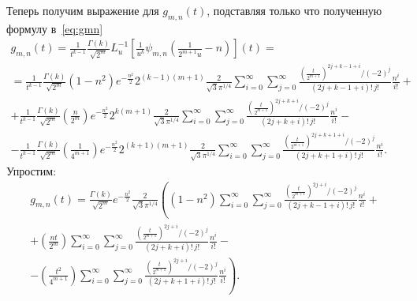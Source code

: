 \documentclass[12pt, a4paper]{report}
\begin{document}
Теперь получим выражение для $g_{m,n}(t)$, подставляя только что полученную формулу в~\ref{eq:gmn}
\begin{multline*}
    g_{m,n}(t) = 
    \frac{1}{t^{k-1}} \frac{\Gamma(k)}{\sqrt{2^m}} L^{-1}_u \left[ \frac{1}{u^k} \psi_{m,n} \left( \frac{1}{2^{m+1} u} - n \right) \right] (t)
=\\=
    \frac{1}{t^{k-1}} \frac{\Gamma(k)}{\sqrt{2^m}} \left( 1-n^2 \right) 
    e^{-\frac{n^2}{2}} 2^{(k-1)(m+1)} \frac{2}{\sqrt{3} \pi^{1/4}}
    \sum_{i=0}^{\infty} \sum_{j=0}^{\infty} \frac{\left( \frac{t}{2^{m+1}} \right) ^{2j+k-1+i} / (-2)^j}{(2j+k-1+i)!\,j!} \frac{n^i}{i!}
+\\+
    \frac{1}{t^{k-1}} \frac{\Gamma(k)}{\sqrt{2^m}} \left( \frac{n}{2^m} \right) 
    e^{-\frac{n^2}{2}} 2^{k(m+1)} \frac{2}{\sqrt{3} \pi^{1/4}}
    \sum_{i=0}^{\infty} \sum_{j=0}^{\infty} \frac{\left( \frac{t}{2^{m+1}} \right) ^{2j+k+i} / (-2)^j}{(2j+k+i)!\,j!} \frac{n^i}{i!}
-\\-
    \frac{1}{t^{k-1}} \frac{\Gamma(k)}{\sqrt{2^m}} \left( \frac{1}{4^{m+1}} \right) 
    e^{-\frac{n^2}{2}} 2^{(k+1)(m+1)} \frac{2}{\sqrt{3} \pi^{1/4}}
    \sum_{i=0}^{\infty} \sum_{j=0}^{\infty} \frac{\left( \frac{t}{2^{m+1}} \right) ^{2j+k+1+i} / (-2)^j}{(2j+k+1+i)!\,j!} \frac{n^i}{i!}
.\end{multline*}
Упростим:
\begin{multline*}
    g_{m,n}(t)
=
    \frac{\Gamma(k)}{\sqrt{2^m}} e^{-\frac{n^2}{2}} \frac{2}{\sqrt{3} \pi^{1/4}} \left(
    \left( 1-n^2 \right) 
    \sum_{i=0}^{\infty} \sum_{j=0}^{\infty} \frac{\left( \frac{t}{2^{m+1}} \right) ^{2j+i} / (-2)^j}{(2j+k-1+i)!\,j!} \frac{n^i}{i!} \right.
+\\+
    \left( \frac{nt}{2^m} \right) 
    \sum_{i=0}^{\infty} \sum_{j=0}^{\infty} \frac{\left( \frac{t}{2^{m+1}} \right) ^{2j+i} / (-2)^j}{(2j+k+i)!\,j!} \frac{n^i}{i!}
-\\- \left.
    \left( \frac{t^2}{4^{m+1}} \right) 
    \sum_{i=0}^{\infty} \sum_{j=0}^{\infty} \frac{\left( \frac{t}{2^{m+1}} \right) ^{2j+i} / (-2)^j}{(2j+k+1+i)!\,j!} \frac{n^i}{i!}
    \right)
.\end{multline*}
\end{document}
